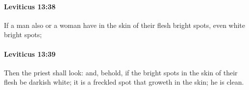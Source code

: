 		\paragraph{Leviticus 13:38} %
			\label{LEVITICUS-13-38}

			If a man also or a woman have in the skin of their flesh bright spots, even white bright spots;


		\paragraph{Leviticus 13:39} %
			\label{LEVITICUS-13-39}

			Then the priest shall look: and, behold, if the bright spots in the skin of their flesh be darkish white; it is a freckled spot that groweth in the skin; he is clean.


